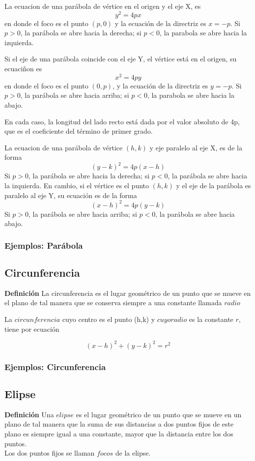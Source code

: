 \documentclass[12pt,a4paper,draft]{article}
\begin{document}
La ecuacion de una parábola de vértice en el origen y el eje X, es 
$$y^2 = 4px$$
en donde el foco es el punto $(p,0)$ y la ecuación de la directriz es $x = -p$. Si $p > 0$, la parábola se abre hacia la derecha; si $p < 0$, la parabola se abre hacia la izquierda.

Si el eje de una parábola coincide con el eje Y, el vértice está en el origen, su ecuaciñon es 
$$x^2 = 4py$$
en donde el foco es el punto $(0,p)$, y la ecuación de la directriz es $y = -p$. Si $p > 0$, la parábola se abre hacia arriba; si $p < 0$, la parabola se abre hacia la abajo.

En cada caso, la longitud del lado recto está dada por el valor absoluto de 4p, que es el coeficiente del término de primer grado.

La ecuacion de una parábola de vértice $(h,k)$ y eje paralelo al eje X, es de la forma
$$(y - k)^2 = 4p(x - h)$$
Si $p > 0$, la parábola se abre hacia la derecha; si $p < 0$, la parábola se abre hacia la izquierda.
En cambio, si el vértice es el punto $(h,k)$ y el eje de la parábola es paralelo al eje Y, su ecuación es de la forma 
$$(x - h)^2 = 4p(y - k)$$
Si $p > 0$, la parábola se abre hacia arriba; si $p < 0$, la parábola se abre hacia abajo.

\subsubsection{Ejemplos: Parábola}

\subsection{Circunferencia} \label{subsec:circunferencia}
\textbf{Definición} La circunferencia es el lugar geométrico de un punto que se mueve en el plano de tal manera que se conserva siempre a una constante llamada $radio$

La $circunferencia$ cuyo centro es el punto (h,k) y $cuyo radio$ es la constante $r$, tiene por ecuación

$${(x - h)^2 + (y - k)^2 = r^2}$$

\subsubsection{Ejemplos: Circunferencia}

\subsection{Elipse}
\textbf{Definición} Una $elipse$ es el lugar geométrico de un punto que se mueve en un plano de tal manera que la suma de sus distancias a dos puntos fijos de este plano es siempre igual a una constante, mayor que la distancia entre los dos puntos.
\\Los dos puntos fijos se llaman $focos$ de la elipse. 
\end{document}
